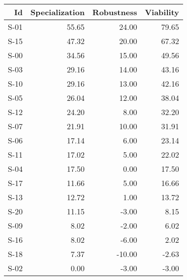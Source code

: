 \begin{tabular}{ | r | r | r | r | }
    \hline
                    Id  &  Specialization  &      Robustness  &       Viability  \\
    \hline
    \hline
                  S-01  &           55.65  &           24.00  &           79.65  \\
    \hline
                  S-15  &           47.32  &           20.00  &           67.32  \\
    \hline
                  S-00  &           34.56  &           15.00  &           49.56  \\
    \hline
                  S-03  &           29.16  &           14.00  &           43.16  \\
    \hline
                  S-10  &           29.16  &           13.00  &           42.16  \\
    \hline
                  S-05  &           26.04  &           12.00  &           38.04  \\
    \hline
                  S-12  &           24.20  &            8.00  &           32.20  \\
    \hline
                  S-07  &           21.91  &           10.00  &           31.91  \\
    \hline
                  S-06  &           17.14  &            6.00  &           23.14  \\
    \hline
                  S-11  &           17.02  &            5.00  &           22.02  \\
    \hline
                  S-04  &           17.50  &            0.00  &           17.50  \\
    \hline
                  S-17  &           11.66  &            5.00  &           16.66  \\
    \hline
                  S-13  &           12.72  &            1.00  &           13.72  \\
    \hline
                  S-20  &           11.15  &           -3.00  &            8.15  \\
    \hline
                  S-09  &            8.02  &           -2.00  &            6.02  \\
    \hline
                  S-16  &            8.02  &           -6.00  &            2.02  \\
    \hline
                  S-18  &            7.37  &          -10.00  &           -2.63  \\
    \hline
                  S-02  &            0.00  &           -3.00  &           -3.00  \\

\end{tabular}
